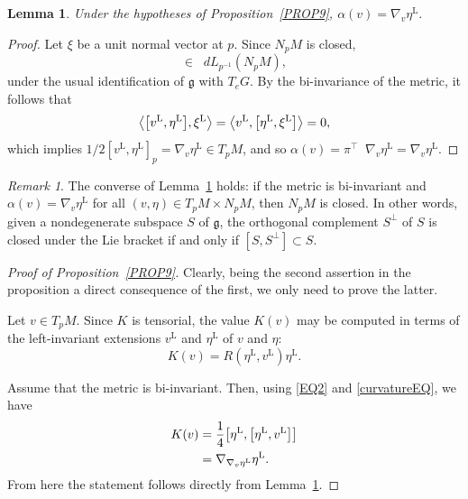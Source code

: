 \documentclass[a4paper,12pt,oneside]{amsart}
\newcommand{\diff}{\mathop{}\!d}
\newcommand{\grad}{\mathop{}\!\nabla}
\theoremstyle{plain}
\newtheorem{lemma}[theorem]{Lemma}
\theoremstyle{remark}
\newtheorem{remark}[theorem]{Remark}
\theoremstyle{definition}
\begin{document}
\begin{lemma} \label{LM10}
Under the hypotheses of Proposition~\ref{PROP9}, $\alpha(v)=\nabla_{v}\eta^{\mathrm{L}}$.
\end{lemma}
\begin{proof}
Let $\xi$ be a unit normal vector at $p$. Since $N_{p}M$ is closed,
\begin{equation*}
[\eta^{\mathrm{L}},\xi^{\mathrm{L}}] \in \diff L_{p^{-1}}(N_{p}M),
\end{equation*}
under the usual identification of $\mathfrak{g}$ with $T_{e}G$. By the bi-invariance of the metric, it follows that
\begin{equation*}
\mleft\langle \mleft[ v^{\mathrm{L}}, \eta^{\mathrm{L}} \mright], \xi^{\mathrm{L}} \mright\rangle = \mleft\langle v^{\mathrm{L}}, \mleft[\eta^{\mathrm{L}}, \xi^{\mathrm{L}} \mright]\mright\rangle=0,
\end{equation*}
which implies $1/2[v^{\mathrm{L}},\eta^{\mathrm{L}}]_{p}=\nabla_{v}\eta^{\mathrm{L}} \in T_{p}M$, and so $\alpha(v)= \pi^{\top}\grad_{v}\eta^{\mathrm{L}}= \nabla_{v}\eta^{\mathrm{L}}$.
\end{proof}

\begin{remark}
The converse of Lemma~\ref{LM10} holds: if the metric is bi-invariant and $\alpha(v) = \nabla_{v}\eta^{\mathrm{L}}$ for all $(v,\eta) \in T_{p}M\times N_{p}M$, then $N_{p}M$ is closed. In other words, given a nondegenerate subspace $S$ of $\mathfrak{g}$, the orthogonal complement $S^{\perp}$ of $S$ is closed under the Lie bracket if and only if $[S, S^{\perp}] \subset S$.
\end{remark}

\begin{proof}[Proof of Proposition~\ref{PROP9}]
Clearly, being the second assertion in the proposition a direct consequence of the first, we only need to prove the latter.

Let $v \in T_{p}M$. Since $K$ is tensorial, the value $K(v)$ may be computed in terms of the left-invariant extensions $v^{\mathrm{L}}$ and $\eta^{\mathrm{L}}$ of $v$ and $\eta$:
\begin{equation*}
K(v) = R(\eta^{\mathrm{L}}, v^{\mathrm{L}})\eta^{\mathrm{L}}.
\end{equation*}

Assume that the metric is bi-invariant. Then, using \eqref{EQ2} and \eqref{curvatureEQ}, we have
\begin{align*}
K(v) &= \frac{1}{4} \mleft[ \eta^{\mathrm{L}}, \mleft[\eta^{\mathrm{L}}, v^{\mathrm{L}} \mright] \mright]\\
&= \nabla_{\nabla_{v}\eta^{\mathrm{L}} }\eta^{\mathrm{L}}.
\end{align*}
From here the statement follows directly from Lemma~\ref{LM10}.
\end{proof}
\end{document}
